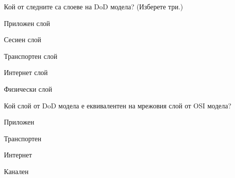 \begin{q}
  Кой от следните са слоеве на DoD модела? (Изберете три.)

  \begin{defractors}
  \item Приложен слой
  \item Сесиен слой
  \item Транспортен слой
  \item Интернет слой
  \item Физически слой
  \end{defractors}
\end{q}

\begin{q}
  Кой слой от DoD модела е еквивалентен на мрежовия слой от OSI модела?

  \begin{defractors}
  \item Приложен
  \item Транспортен
  \item Интернет
  \item Канален
  \end{defractors}
\end{q}